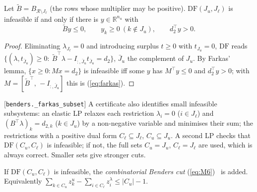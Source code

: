 \begin{lemma}\label{lem:farkas}
Let $\tilde B=B_{\mathcal R\setminus J_\ell}$ (the rows whose multiplier may be positive).
$\mathrm{DF}(J_u,J_\ell)$ is infeasible if and only if there is $y\in\mathbb R^{n_u}$ with
\begin{equation}
\tilde By\le0,\qquad y_k\ge0\ (k\notin J_u),\qquad d_2^\top y>0 .
\label{eq:farkas}
\end{equation}
\end{lemma}
\begin{proof}
Eliminating $\lambda_{J_\ell}=0$ and introducing surplus $t\ge0$ with $t_{J_u}=0$,
$\mathrm{DF}$ reads $\{(\lambda,t_{\bar J_u})\ge0:\ \tilde B^\top\lambda-I_{:,\bar J_u}t_{\bar J_u}=d_2\}$,
$\bar J_u$ the complement of $J_u$. By Farkas' lemma, $\{x\ge0:Mx=d_2\}$ is infeasible iff
some $y$ has $M^\top y\le0$ and $d_2^\top y>0$; with $M=[\tilde B^\top,\,-I_{:,\bar J_u}]$ this is
(\ref{eq:farkas}).
\end{proof}
[\texttt{benders.\_farkas\_subset}] A certificate also identifies small infeasible subsystems:
an elastic LP relaxes each restriction $\lambda_i=0$ ($i\in J_\ell$) and
$(B^\top\lambda)_k=d_{2,k}$ ($k\in J_u$) by a non-negative variable and minimises their sum; the
restrictions with a positive dual form $C_\ell\subseteq J_\ell$, $C_u\subseteq J_u$. A second LP checks
that $\mathrm{DF}(C_u,C_\ell)$ is infeasible; if not, the full sets $C_u=J_u$, $C_\ell=J_\ell$ are used,
which is always correct. Smaller sets give stronger cuts.

If $\mathrm{DF}(C_u,C_\ell)$ is infeasible, the \emph{combinatorial Benders cut}
(\ref{eq:M6})~\cite{codato2006} is added. Equivalently
$\sum_{k\in C_u}z^u_k-\sum_{i\in C_\ell}z^\lambda_i\le|C_u|-1$.

